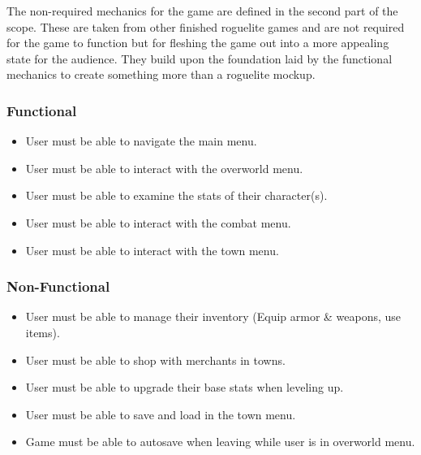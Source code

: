 \documentclass[10pt,conference,onecolumn,compsoc]{IEEEtran}
\begin{document}
The non-required mechanics for the game are defined in the second part of the scope. These are taken from other finished roguelite games and are not required for the game to function but for fleshing the game out into a more appealing state for the audience. They build upon the foundation laid by the functional mechanics to create something more than a roguelite mockup.

\subsubsection{Functional}
\begin{itemize}
\item User must be able to navigate the main menu.
\item User must be able to interact with the overworld menu.
\item User must be able to examine the stats of their character(s).
\item User must be able to interact with the combat menu.
\item User must be able to interact with the town menu.
\end{itemize}

\subsubsection{Non-Functional}
\begin{itemize}
\item User must be able to manage their inventory (Equip armor \& weapons, use items).
\item User must be able to shop with merchants in towns.
\item User must be able to upgrade their base stats when leveling up.
\item User must be able to save and load in the town menu.
\item Game must be able to autosave when leaving while user is in overworld menu.
\end{itemize}
\end{document}
